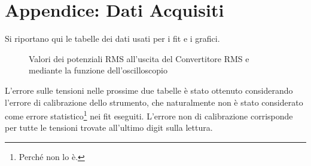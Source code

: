 \documentclass[a4paper,10pt]{article}
\begin{document}
\pagebreak

\section{Appendice: Dati Acquisiti}
Si riportano qui le tabelle dei dati usati per i fit e i grafici.

\begin{table}[H]
	\centering
	
	\caption{Dati acquisiti per la risposta in frequenza della prima parte del preamplificatore.}
	\label{tab:prepreamp}
\end{table}

\begin{table}[H]
	\centering
	
	\caption{Dati acquisiti per la risposta in frequenza della seconda parte del preamplificatore.}
	\label{tab:postpreamp}
\end{table}

\begin{figure}
	\begin{minipage}{0.64\textwidth}
		\begin{table}[H]
			\centering
			
			\caption{Dati acquisiti per la risposta in frequenza del passabanda.}
			\label{tab:bandpass}
		\end{table}
	\end{minipage}
	\begin{minipage}{0.34\textwidth}
		\begin{table}[H]
			\centering
			
			\caption{Valori dei potenziali RMS all'uscita del Convertitore RMS e mediante la funzione dell'oscilloscopio}
			\label{tab:RMScal}
		\end{table}
	\end{minipage}
\end{figure}

\begin{table}[H]
	\centering
	
	\caption{Valori delle frequenze utilizzate e del potenziale in uscita al circuito utilizzando un partitore 1000:1.}
	\label{tab:totamp}
\end{table}

\pagebreak

L'errore sulle tensioni nelle prossime due tabelle è stato ottenuto considerando l'errore di calibrazione dello strumento, che naturalmente non è stato considerato come errore statistico\footnote{Perché non lo è.} nei fit eseguiti.
L'errore non di calibrazione corrisponde per tutte le tensioni trovate all'ultimo digit sulla lettura.

\begin{table}[H]
	\centering
	
	\caption{Valori delle resistenze utilizzate e del potenziale all'uscita del circuito.}
	\label{tab:lastfit}
\end{table}

\begin{table}[H]
	\centering
	
	\caption{Valori delle resistenze utilizzate e del potenziale all'uscita del circuito.}
	\label{tab:lastfit1}
\end{table}
\end{document}
